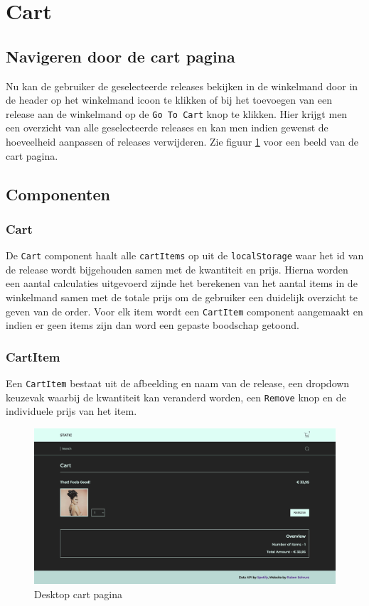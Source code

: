 \section{Cart}

\subsection{Navigeren door de cart pagina}

Nu kan de gebruiker de geselecteerde releases bekijken in de winkelmand door in de header op het winkelmand icoon te klikken of bij het toevoegen van een release aan de winkelmand op de \texttt{Go To Cart} knop te klikken. Hier krijgt men een overzicht van alle geselecteerde releases en kan men indien gewenst de hoeveelheid aanpassen of releases verwijderen. Zie figuur \ref{fig:desktopCart} voor een beeld van de cart pagina.

\subsection{Componenten}

\subsubsection{Cart}

De \texttt{Cart} component haalt alle \texttt{cartItems} op uit de \texttt{localStorage} waar het id van de release wordt bijgehouden samen met de kwantiteit en prijs. Hierna worden een aantal calculaties uitgevoerd zijnde het berekenen van het aantal items in de winkelmand samen met de totale prijs om de gebruiker een duidelijk overzicht te geven van de order. Voor elk item wordt een \texttt{CartItem} component aangemaakt en indien er geen items zijn dan word een gepaste boodschap getoond.

\subsubsection{CartItem}

Een \texttt{CartItem} bestaat uit de afbeelding en naam van de release, een dropdown keuzevak waarbij de kwantiteit kan veranderd worden, een \texttt{Remove} knop en de individuele prijs van het item.

\begin{figure}[h]
	\centering
	\includegraphics[width=1\linewidth]{graphics/desktopCart}
	\caption[Desktop cart pagina]{Desktop cart pagina}
	\label{fig:desktopCart}
\end{figure}

